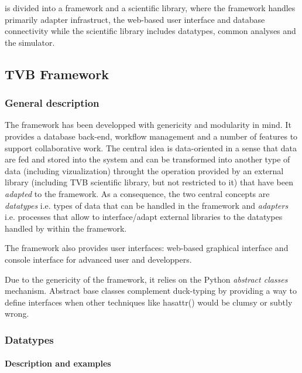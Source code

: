 
\TVB is divided into a framework and a scientific library, where the framework
handles primarily adapter infrastruct, the web-based user interface and
database connectivity while the scientific library includes datatypes, 
common analyses and the simulator. 


\subsection{TVB Framework}

\subsubsection{General description}

The framework has been developped with genericity and modularity in mind. It
provides a database back-end, workflow management and a number of features to
support collaborative work.  The central idea is data-oriented in a sense that
data are fed and stored into the system and can be transformed into another type
of data (including vizualization) throught the operation provided by an external
library (including TVB scientific library, but not restricted to it) that have
been \emph{adapted} to the framework. As a consequence, the two central concepts
are \emph{datatypes} i.e. types of data that can be handled in the framework and
\emph{adapters} i.e. processes that allow to interface/adapt external libraries
to  the datatypes handled by within the framework.

The framework also provides user interfaces: web-based graphical interface and
console interface for advanced user and developpers.

Due to the genericity of the framework, it relies on
the Python \emph{abstract classes} mechanism.
Abstract base classes complement duck-typing by providing a way to define
interfaces when other techniques like hasattr() would be clumsy or subtly wrong.

\subsubsection{Datatypes}

\paragraph{Description and examples}

